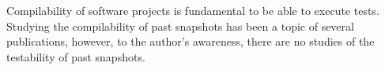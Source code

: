 
Compilability of software projects is fundamental to be able to execute tests. %
Studying the compilability of past snapshots has been a topic of several publications, however, to the author's awareness, there are no studies of the testability of past snapshots. 



